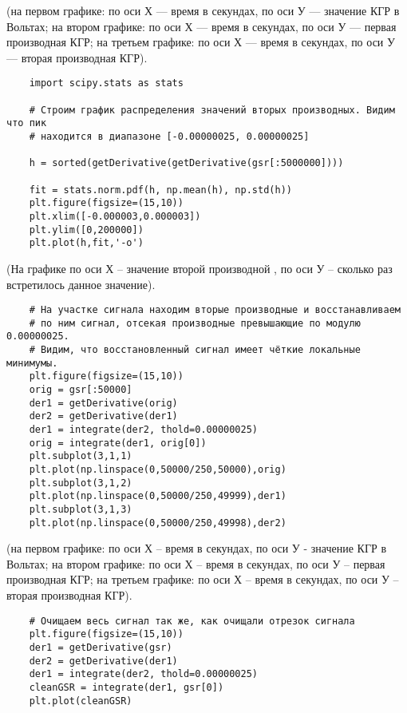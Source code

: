 
(на первом графике: по оси Х — время в секундах, по оси У — значение КГР в Вольтах;
на втором графике: по оси Х — время в секундах, по оси У — первая производная КГР;
на третьем графике: по оси Х — время в секундах, по оси У — вторая производная КГР).

\begin{verbatim}
    import scipy.stats as stats

    # Строим график распределения значений вторых производных. Видим что пик
    # находится в диапазоне [-0.00000025, 0.00000025]

    h = sorted(getDerivative(getDerivative(gsr[:5000000])))

    fit = stats.norm.pdf(h, np.mean(h), np.std(h))
    plt.figure(figsize=(15,10))
    plt.xlim([-0.000003,0.000003])
    plt.ylim([0,200000])
    plt.plot(h,fit,'-o')
\end{verbatim}


(На графике по оси Х – значение второй производной , по оси У – сколько раз встретилось данное значение). 

\begin{verbatim}
    # На участке сигнала находим вторые производные и восстанавливаем
    # по ним сигнал, отсекая производные превышающие по модулю 0.00000025.
    # Видим, что восстановленный сигнал имеет чёткие локальные минимумы.
    plt.figure(figsize=(15,10))
    orig = gsr[:50000]
    der1 = getDerivative(orig)
    der2 = getDerivative(der1)
    der1 = integrate(der2, thold=0.00000025)
    orig = integrate(der1, orig[0])
    plt.subplot(3,1,1)
    plt.plot(np.linspace(0,50000/250,50000),orig)
    plt.subplot(3,1,2)
    plt.plot(np.linspace(0,50000/250,49999),der1)
    plt.subplot(3,1,3)
    plt.plot(np.linspace(0,50000/250,49998),der2)
\end{verbatim}


(на первом графике: по оси Х – время в секундах, по оси У  - значение КГР в Вольтах;
на втором графике: по оси Х – время в секундах, по оси У – первая производная КГР;
на третьем графике: по оси Х – время в секундах, по оси У – вторая производная КГР).

\begin{verbatim}
    # Очищаем весь сигнал так же, как очищали отрезок сигнала
    plt.figure(figsize=(15,10))
    der1 = getDerivative(gsr)
    der2 = getDerivative(der1)
    der1 = integrate(der2, thold=0.00000025)
    cleanGSR = integrate(der1, gsr[0])
    plt.plot(cleanGSR)
\end{verbatim}

